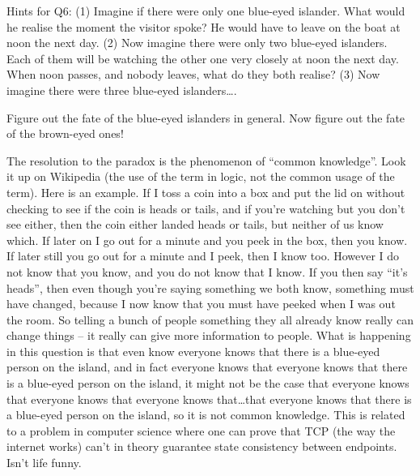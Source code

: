 \documentclass[10pt]{article}
\begin{document}
\medskip

Hints for Q6: (1) Imagine if there were only one blue-eyed islander. What would he realise the moment the visitor spoke? He would have to leave on the boat at noon the next day. (2) Now imagine there were only two blue-eyed islanders. Each of them will be watching the other one very closely at noon the next day. When noon passes, and nobody leaves, what do they both realise? (3) Now imagine there were three blue-eyed islanders\ldots.

Figure out the fate of the blue-eyed islanders in general. Now figure out the fate of the brown-eyed ones!

The resolution to the paradox is the phenomenon of ``common knowledge''. Look it up on Wikipedia (the use of the term in logic, not the common usage of the term). Here is an example. If I toss a coin into a box and put the lid on without checking to see if the coin is heads or tails, and if you're watching but you don't see either, then the coin either landed heads or tails, but neither of us know which. If later on I go out for a minute and you peek in the box, then you know. If later still you go out for a minute and I peek, then I know too. However I do not know that you know, and you do not know that I know. If you then say ``it's heads'', then even though you're saying something we both know, something must have changed, because I now know that you must have peeked when I was out the room. So telling a bunch of people something they all already know really can change things -- it really can give more information to people. What is happening in this question is that even know everyone knows that there is a blue-eyed person on the island, and in fact everyone knows that everyone knows that there is a blue-eyed person on the island, it might not be the case that everyone knows that everyone knows that everyone knows that\ldots that everyone knows that there is a blue-eyed person on the island, so it is not common knowledge. This is related to a problem in computer science where one can prove that TCP (the way the internet works) can't in theory guarantee state consistency between endpoints. Isn't life funny.
\end{document}
